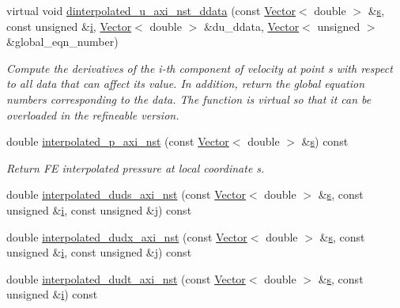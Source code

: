 \begin{DoxyCompactItemize}
virtual void \hyperlink{classoomph_1_1GeneralisedNewtonianAxisymmetricNavierStokesEquations_a115dec50e9fc5d82449a327d420c9790}{dinterpolated\+\_\+u\+\_\+axi\+\_\+nst\+\_\+ddata} (const \hyperlink{classoomph_1_1Vector}{Vector}$<$ double $>$ \&\hyperlink{cfortran_8h_ab7123126e4885ef647dd9c6e3807a21c}{s}, const unsigned \&\hyperlink{cfortran_8h_adb50e893b86b3e55e751a42eab3cba82}{i}, \hyperlink{classoomph_1_1Vector}{Vector}$<$ double $>$ \&du\+\_\+ddata, \hyperlink{classoomph_1_1Vector}{Vector}$<$ unsigned $>$ \&global\+\_\+eqn\+\_\+number)
\begin{DoxyCompactList}\small\item\em Compute the derivatives of the i-\/th component of velocity at point s with respect to all data that can affect its value. In addition, return the global equation numbers corresponding to the data. The function is virtual so that it can be overloaded in the refineable version. \end{DoxyCompactList}\item 
double \hyperlink{classoomph_1_1GeneralisedNewtonianAxisymmetricNavierStokesEquations_aca81008fa3d8a4b7d8c9c95300087dd2}{interpolated\+\_\+p\+\_\+axi\+\_\+nst} (const \hyperlink{classoomph_1_1Vector}{Vector}$<$ double $>$ \&\hyperlink{cfortran_8h_ab7123126e4885ef647dd9c6e3807a21c}{s}) const
\begin{DoxyCompactList}\small\item\em Return FE interpolated pressure at local coordinate s. \end{DoxyCompactList}\item 
double \hyperlink{classoomph_1_1GeneralisedNewtonianAxisymmetricNavierStokesEquations_a9e2b946286e21282b9332de43c3d7e51}{interpolated\+\_\+duds\+\_\+axi\+\_\+nst} (const \hyperlink{classoomph_1_1Vector}{Vector}$<$ double $>$ \&\hyperlink{cfortran_8h_ab7123126e4885ef647dd9c6e3807a21c}{s}, const unsigned \&\hyperlink{cfortran_8h_adb50e893b86b3e55e751a42eab3cba82}{i}, const unsigned \&j) const
\item 
double \hyperlink{classoomph_1_1GeneralisedNewtonianAxisymmetricNavierStokesEquations_acf2ff45f3266fe02f869bc3a14c246f5}{interpolated\+\_\+dudx\+\_\+axi\+\_\+nst} (const \hyperlink{classoomph_1_1Vector}{Vector}$<$ double $>$ \&\hyperlink{cfortran_8h_ab7123126e4885ef647dd9c6e3807a21c}{s}, const unsigned \&\hyperlink{cfortran_8h_adb50e893b86b3e55e751a42eab3cba82}{i}, const unsigned \&j) const
\item 
double \hyperlink{classoomph_1_1GeneralisedNewtonianAxisymmetricNavierStokesEquations_ad03e009eccb329daac282607b6501637}{interpolated\+\_\+dudt\+\_\+axi\+\_\+nst} (const \hyperlink{classoomph_1_1Vector}{Vector}$<$ double $>$ \&\hyperlink{cfortran_8h_ab7123126e4885ef647dd9c6e3807a21c}{s}, const unsigned \&\hyperlink{cfortran_8h_adb50e893b86b3e55e751a42eab3cba82}{i}) const

\end{DoxyCompactItemize}
